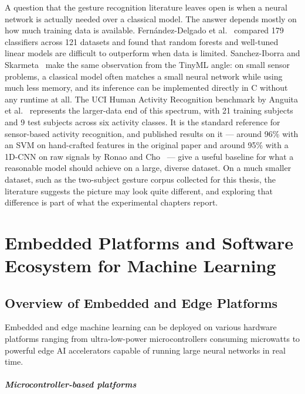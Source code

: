 A question that the gesture recognition literature leaves open is when a neural network is actually needed over a classical model. The answer depends mostly on how much training data is available. Fern\'andez-Delgado et al.~\cite{fernandez2014classifiers} compared 179 classifiers across 121 datasets and found that random forests and well-tuned linear models are difficult to outperform when data is limited. Sanchez-Iborra and Skarmeta~\cite{sanchez2020tinyml} make the same observation from the TinyML angle: on small sensor problems, a classical model often matches a small neural network while using much less memory, and its inference can be implemented directly in C without any runtime at all. The UCI Human Activity Recognition benchmark by Anguita et al.~\cite{anguita2013uci} represents the larger-data end of this spectrum, with 21 training subjects and 9 test subjects across six activity classes. It is the standard reference for sensor-based activity recognition, and published results on it --- around 96\% with an SVM on hand-crafted features in the original paper and around 95\% with a 1D-CNN on raw signals by Ronao and Cho~\cite{ronao2016deep} --- give a useful baseline for what a reasonable model should achieve on a large, diverse dataset. On a much smaller dataset, such as the two-subject gesture corpus collected for this thesis, the literature suggests the picture may look quite different, and exploring that difference is part of what the experimental chapters report.

\chapter{Embedded Platforms and Software Ecosystem for Machine Learning}
\label{chap:platforms}

\section{Overview of Embedded and Edge Platforms}
Embedded and edge machine learning can be deployed on various hardware platforms ranging from ultra-low-power microcontrollers consuming microwatts to powerful edge AI accelerators capable of running large neural networks in real time.

\paragraph{Microcontroller-based platforms}

